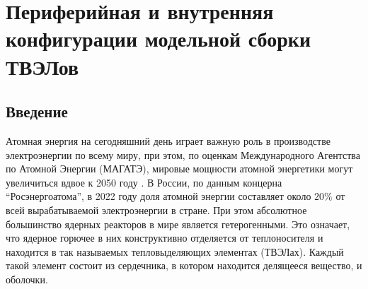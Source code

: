 \chapter{Периферийная и внутренняя конфигурации модельной сборки ТВЭЛов}\label{ch:ch4}
%
\section{Введение}\label{ch4:intro}
%
%
Атомная энергия на сегодняшний день играет важную роль в производстве электроэнергии по всему миру, 
при этом, по оценкам Международного Агентства по Атомной Энергии (МАГАТЭ), 
мировые мощности атомной энергетики могут увеличиться вдвое к 2050 году \cite{gritsevskyi2016outlook}.
%
В России, по данным концерна ``Росэнергоатома'', в 2022 году доля атомной энергии составляет около 
$20\%$ от всей вырабатываемой электроэнергии в стране. 
%
При этом абсолютное большинство ядерных реакторов в мире является гетерогенными.
%
Это означает, что ядерное горючее в них конструктивно отделяется от теплоносителя и 
находится в так называемых тепловыделяющих элементах (ТВЭЛах).
%
Каждый такой элемент состоит из сердечника, в котором находится делящееся вещество, и оболочки.
% 


